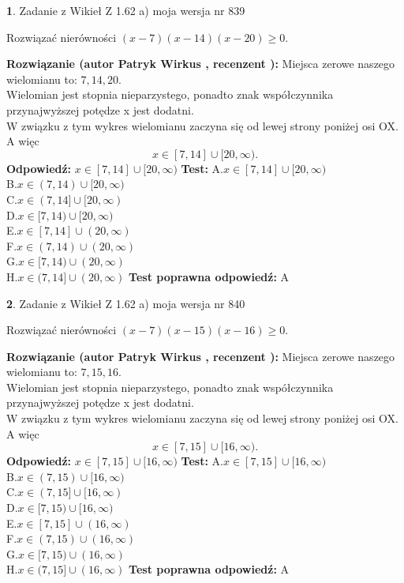 \documentclass[12pt, a4paper]{article}
\theoremstyle{definition} %
\newtheorem{zad}{}
\newcommand{\zadStart}[1]{\begin{zad}#1\newline}
\newcommand{\zadStop}{\end{zad}}
\newcommand{\rozwStart}[2]{\noindent \textbf{Rozwiązanie (autor #1 , recenzent #2): }\newline}
\newcommand{\rozwStop}{\newline}
\newcommand{\odpStart}{\noindent \textbf{Odpowiedź:}\newline}
\newcommand{\odpStop}{\newline}
\newcommand{\testStart}{\noindent \textbf{Test:}\newline}
\newcommand{\testStop}{\newline}
\newcommand{\kluczStart}{\noindent \textbf{Test poprawna odpowiedź:}\newline}
\newcommand{\kluczStop}{\newline}
\begin{document}
\zadStart{Zadanie z Wikieł Z 1.62 a) moja wersja nr 839}

Rozwiązać nierówności $(x-7)(x-14)(x-20)\ge0$.
\zadStop
\rozwStart{Patryk Wirkus}{}
Miejsca zerowe naszego wielomianu to: $7, 14, 20$.\\
Wielomian jest stopnia nieparzystego, ponadto znak współczynnika przy\linebreak najwyższej potędze x jest dodatni.\\ W związku z tym wykres wielomianu zaczyna się od lewej strony poniżej osi OX. A więc $$x \in [7,14] \cup [20,\infty).$$
\rozwStop
\odpStart
$x \in [7,14] \cup [20,\infty)$
\odpStop
\testStart
A.$x \in [7,14] \cup [20,\infty)$\\
B.$x \in (7,14) \cup [20,\infty)$\\
C.$x \in (7,14] \cup [20,\infty)$\\
D.$x \in [7,14) \cup [20,\infty)$\\
E.$x \in [7,14] \cup (20,\infty)$\\
F.$x \in (7,14) \cup (20,\infty)$\\
G.$x \in [7,14) \cup (20,\infty)$\\
H.$x \in (7,14] \cup (20,\infty)$
\testStop
\kluczStart
A
\kluczStop



\zadStart{Zadanie z Wikieł Z 1.62 a) moja wersja nr 840}

Rozwiązać nierówności $(x-7)(x-15)(x-16)\ge0$.
\zadStop
\rozwStart{Patryk Wirkus}{}
Miejsca zerowe naszego wielomianu to: $7, 15, 16$.\\
Wielomian jest stopnia nieparzystego, ponadto znak współczynnika przy\linebreak najwyższej potędze x jest dodatni.\\ W związku z tym wykres wielomianu zaczyna się od lewej strony poniżej osi OX. A więc $$x \in [7,15] \cup [16,\infty).$$
\rozwStop
\odpStart
$x \in [7,15] \cup [16,\infty)$
\odpStop
\testStart
A.$x \in [7,15] \cup [16,\infty)$\\
B.$x \in (7,15) \cup [16,\infty)$\\
C.$x \in (7,15] \cup [16,\infty)$\\
D.$x \in [7,15) \cup [16,\infty)$\\
E.$x \in [7,15] \cup (16,\infty)$\\
F.$x \in (7,15) \cup (16,\infty)$\\
G.$x \in [7,15) \cup (16,\infty)$\\
H.$x \in (7,15] \cup (16,\infty)$
\testStop
\kluczStart
A
\kluczStop
\end{document}

